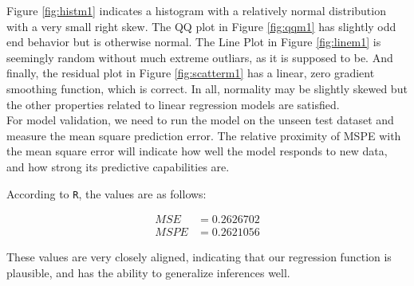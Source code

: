 \documentclass{article}
\begin{document}
      Figure \ref{fig:histm1} indicates a histogram with a relatively normal
      distribution with a very small right skew. The QQ plot in Figure
      \ref{fig:qqm1} has slightly odd end behavior but is otherwise normal.
      The Line Plot in Figure \ref{fig:linem1} is seemingly random without
      much extreme outliars, as it is supposed to be. And finally, the
      residual plot in Figure \ref{fig:scatterm1} has a linear, zero gradient
      smoothing function, which is correct. In all, normality may be slightly
      skewed but the other properties related to linear regression models are
      satisfied. \\

      For model validation, we need to run the model on the unseen test dataset and
      measure the mean square prediction error. The relative proximity of MSPE with
      the mean square error will indicate how well the model responds to new data,
      and how strong its predictive capabilities are.

      According to \texttt{R}, the values are as follows:

      \begin{align*}
        MSE &= 0.2626702 \\
        MSPE &= 0.2621056
      \end{align*}

      These values are very closely aligned, indicating that our regression function
      is plausible, and has the ability to generalize inferences well.
\end{document}
